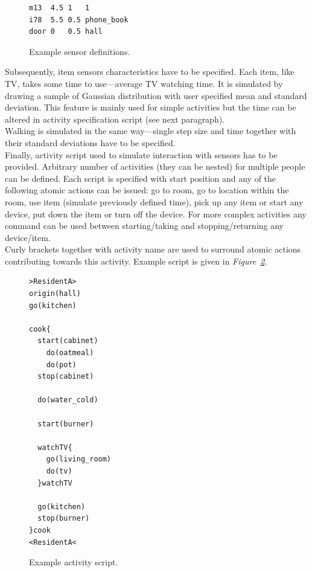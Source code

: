 \documentclass[10pt, a4paper, pdflatex, leqno, twoside, openright]{report}
\begin{document}
\begin{figure}[htb]
  \begin{lstlisting}
m13  4.5 1   1
i78  5.5 0.5 phone_book
door 0   0.5 hall
  \end{lstlisting}
  \caption{Example sensor definitions.\label{lst:sensorLayout}}
\end{figure}

Subsequently, item sensors characteristics have to be specified. Each item, like TV, takes some time to use---average TV watching time. It is simulated by drawing a sample of Gaussian distribution with user specified mean and standard deviation. This feature is mainly used for simple activities but the time can be altered in activity specification script (see next paragraph).\\
Walking is simulated in the same way---single step size and time together with their standard deviations have to be specified.\\

Finally, activity script used to simulate interaction with sensors has to be provided. Arbitrary number of activities (they can be nested) for multiple people can be defined. Each script is specified with start position and any of the following atomic actions can be issued: go to room, go to location within the room, use item (simulate previously defined time), pick up any item or start any device, put down the item or turn off the device. For more complex activities any command can be used between starting/taking and stopping/returning any device/item.\\
Curly brackets together with activity name are used to surround atomic actions contributing towards this activity. Example script is given in \emph{Figure~\ref{lst:path}}.\\

\begin{figure}[htb]
  \begin{lstlisting}
>ResidentA>
origin(hall)
go(kitchen)

cook{
  start(cabinet)
    do(oatmeal)
    do(pot)
  stop(cabinet)

  do(water_cold)

  start(burner)

  watchTV{
    go(living_room)
    do(tv)
  }watchTV

  go(kitchen)
  stop(burner)
}cook
<ResidentA<
  \end{lstlisting}
  \caption{Example activity script.\label{lst:path}}
\end{figure}
\end{document}
